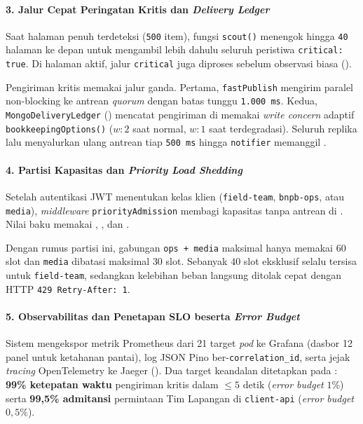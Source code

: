 \paragraph*{3. Jalur Cepat Peringatan Kritis dan \textit{Delivery Ledger}}
Saat halaman penuh terdeteksi (\texttt{500} item), fungsi \texttt{scout()} menengok hingga \texttt{40} halaman ke depan untuk mengambil lebih dahulu seluruh peristiwa \texttt{critical: true}. Di halaman aktif, jalur \texttt{critical} juga diproses sebelum observasi biasa ().

Pengiriman kritis memakai jalur ganda. Pertama, \texttt{fastPublish} mengirim paralel non-blocking ke antrean \textit{quorum}  dengan batas tunggu \texttt{1.000 ms}. Kedua, \texttt{MongoDeliveryLedger} () mencatat pengiriman di  memakai \textit{write concern} adaptif \texttt{bookkeepingOptions()} ($w:2$ saat normal, $w:1$ saat terdegradasi). Seluruh replika lalu menyalurkan ulang antrean tiap \texttt{500 ms} hingga \texttt{notifier} memanggil .

\paragraph*{4. Partisi Kapasitas dan \textit{Priority Load Shedding}}
Setelah autentikasi JWT menentukan kelas klien (\texttt{field-team}, \texttt{bnpb-ops}, atau \texttt{media}), \textit{middleware} \texttt{priorityAdmission} membagi kapasitas tanpa antrean di . Nilai baku memakai , , dan .

Dengan rumus partisi ini, gabungan \texttt{ops + media} maksimal hanya memakai $60$ slot dan \texttt{media} dibatasi maksimal $30$ slot. Sebanyak $40$ slot eksklusif selalu tersisa untuk \texttt{field-team}, sedangkan kelebihan beban langsung ditolak cepat dengan HTTP \texttt{429 Retry-After: 1}.

\paragraph*{5. Observabilitas dan Penetapan SLO beserta \textit{Error Budget}}
Sistem mengekspor metrik Prometheus dari 21 target \textit{pod} ke Grafana (dasbor 12 panel untuk ketahanan pantai), log JSON Pino ber-\texttt{correlation\_id}, serta jejak \textit{tracing} OpenTelemetry ke Jaeger (). Dua target keandalan ditetapkan pada : \textbf{99\% ketepatan waktu} pengiriman kritis dalam $\le 5\text{ detik}$ (\textit{error budget} $1\%$) serta \textbf{99,5\% admitansi} permintaan Tim Lapangan di \texttt{client-api} (\textit{error budget} $0{,}5\%$).

